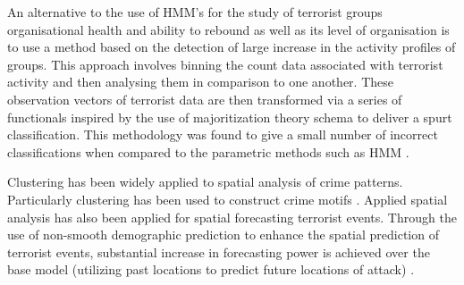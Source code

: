 An alternative to the use of HMM's for the study of terrorist groups organisational health and ability to rebound as well as its level of organisation is to use a method based on the detection of large increase in the activity profiles of groups. This approach involves binning the count data associated with terrorist activity and then analysing them in comparison to one another. These observation vectors of terrorist data are then transformed via a series of functionals inspired by the use of majoritization theory schema to deliver a spurt classification. This methodology was found to give a small number of incorrect classifications when compared to the parametric methods such as HMM \citep{raghavan2016tracking}. 

Clustering has been widely applied to spatial analysis of crime patterns. Particularly clustering has been used to construct crime motifs \citep{nath2006crime}. Applied spatial analysis has also been applied for spatial forecasting terrorist events. Through the use of non-smooth demographic prediction to enhance the spatial prediction of terrorist events, substantial  increase in forecasting power is achieved over the base model (utilizing past locations to predict future locations of attack) \citep{brown2004spatial}.

